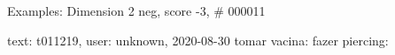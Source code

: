 \begin{frame}{Examples: Dimension 2 neg, score -3, \# 000011}
\footnotesize
\begin{alertblock}{text: t011219, user: unknown, 2020-08-30}
tomar vacina: \textbf{}  
 fazer piercing: 
\textbf{}  
\end{alertblock}
\end{frame}
